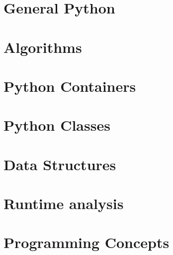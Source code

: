 \documentclass[numerate]{cheatsheet}
\author{Julian Lotzer – jlotzer@student.ethz.ch\\ 
Daniel Steinhauser – dsteinhauser@student.ethz.ch\\
Modified by:
Christian Leser - cleser@ethz.ch
\\ \vspace*{-0.2em}}
\begin{document}
\section{General Python} %
	
    
    
    
    

\section{Algorithms} %
    
    

\section{Python Containers} %
    
    
    

\section{Python Classes} %
    
    
    
    

\section{Data Structures} %
    
    
    
    
    
    

\section{Runtime analysis} %
    

\section{Programming Concepts} %
    
    
    
    
\end{document}
